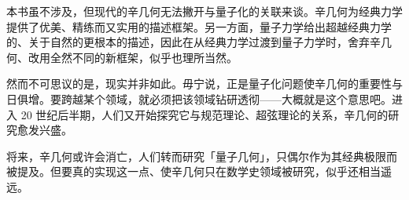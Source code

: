本书虽不涉及，但现代的辛几何无法撇开与量子化的关联来谈。辛几何为经典力学提供了优美、精练而又实用的描述框架。另一方面，量子力学给出超越经典力学的、关于自然的更根本的描述，因此在从经典力学过渡到量子力学时，舍弃辛几何、改用全然不同的新框架，似乎也理所当然。

然而不可思议的是，现实并非如此。毋宁说，正是量子化问题使辛几何的重要性与日俱增。要跨越某个领域，就必须把该领域钻研透彻——大概就是这个意思吧。进入 20 世纪后半期，人们又开始探究它与规范理论、超弦理论的关系，辛几何的研究愈发兴盛。

将来，辛几何或许会消亡，人们转而研究「量子几何」，只偶尔作为其经典极限而被提及。但要真的实现这一点、使辛几何只在数学史领域被研究，似乎还相当遥远。



